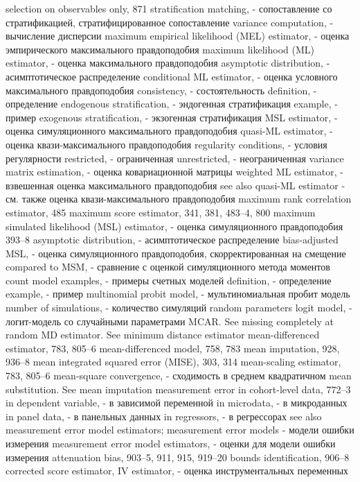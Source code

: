 selection on observables only, 871 
stratification matching, - сопоставление со стратификацией, стратифицированное сопоставление
variance computation, - вычисление дисперсии
maximum empirical likelihood (MEL) estimator, - оценка эмпирического максимального правдоподобия
maximum likelihood (ML) estimator, - оценка максимального правдоподобия
asymptotic distribution, - асимптотическое распределение
conditional ML estimator, - оценка условного максимального правдоподобия
consistency, - состоятельность
definition, - определение
endogenous stratification, - эндогенная стратификация
example, - пример
exogenous stratification, - экзогенная стратификация
MSL estimator, - оценка симуляционного максимального правдоподобия
quasi-ML estimator, - оценка квази-максимального правдоподобия
regularity conditions, - условия регулярности
restricted, - ограниченная
unrestricted, - неограниченная
variance matrix estimation, - оценка ковариационной матрицы
weighted ML estimator, - взвешенная оценка максимального правдоподобия
see also quasi-ML estimator - см. также оценка квази-максимального правдоподобия
maximum rank correlation estimator, 485 maximum score estimator, 341, 381, 483–4, 800 
maximum simulated likelihood (MSL) estimator, - оценка симуляционного правдоподобия
393–8
asymptotic distribution, - асимптотическое распределение
bias-adjusted MSL, - оценка симуляционного правдоподобия, скорректированная на смещение
compared to MSM, - сравнение с оценкой симуляционного метода моментов
count model examples, - примеры счетных моделей
definition, - определение
example, - пример
multinomial probit model, - мультиномиальная пробит модель
number of simulations, - количество симуляций
random parameters logit model, - логит-модель со случайными параметрами
MCAR. See missing completely at random
MD estimator. See minimum distance estimator mean-differenced estimator, 783, 805–6 mean-differenced model, 758, 783
mean imputation, 928, 936–8
mean integrated squared error (MISE), 303, 314 mean-scaling estimator, 783, 805–6 
mean-square convergence, - сходимость в среднем квадратичном
mean substitution. See mean imputation measurement error
in cohort-level data, 772–3
in dependent variable, - в зависимой переменной
in microdata, - в микроданных
in panel data, - в панельных данных
in regressors, - в регрессорах
see also measurement error model estimators;
measurement error models - модели ошибки измерения
measurement error model estimators, - оценки для модели ошибки измерения
attenuation bias, 903–5, 911, 915, 919–20 
bounds identification, 906–8
corrected score estimator, 
IV estimator, - оценка инструментальных переменных
